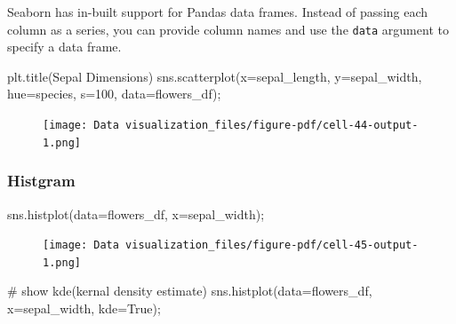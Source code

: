 \documentclass[
  letterpaper,
  DIV=11,
  numbers=noendperiod]{scrreprt}
\newenvironment{Shaded}{\begin{snugshade}}{\end{snugshade}}
\newcommand{\CommentTok}[1]{\textcolor[rgb]{0.37,0.37,0.37}{#1}}
\newcommand{\DecValTok}[1]{\textcolor[rgb]{0.68,0.00,0.00}{#1}}
\newcommand{\NormalTok}[1]{\textcolor[rgb]{0.00,0.23,0.31}{#1}}
\newcommand{\OperatorTok}[1]{\textcolor[rgb]{0.37,0.37,0.37}{#1}}
\newcommand{\StringTok}[1]{\textcolor[rgb]{0.13,0.47,0.30}{#1}}
\newcommand{\VariableTok}[1]{\textcolor[rgb]{0.07,0.07,0.07}{#1}}
\begin{document}
Seaborn has in-built support for Pandas data frames. Instead of passing
each column as a series, you can provide column names and use the
\texttt{data} argument to specify a data frame.

\begin{Shaded}
\begin{Highlighting}[]
\NormalTok{plt.title(}\StringTok{\textquotesingle{}Sepal Dimensions\textquotesingle{}}\NormalTok{)}
\NormalTok{sns.scatterplot(x}\OperatorTok{=}\StringTok{\textquotesingle{}sepal\_length\textquotesingle{}}\NormalTok{, }
\NormalTok{                y}\OperatorTok{=}\StringTok{\textquotesingle{}sepal\_width\textquotesingle{}}\NormalTok{, }
\NormalTok{                hue}\OperatorTok{=}\StringTok{\textquotesingle{}species\textquotesingle{}}\NormalTok{,}
\NormalTok{                s}\OperatorTok{=}\DecValTok{100}\NormalTok{,}
\NormalTok{                data}\OperatorTok{=}\NormalTok{flowers\_df)}\OperatorTok{;}
\end{Highlighting}
\end{Shaded}

\begin{figure}[H]

{\centering \texttt{[image: Data visualization\_files/figure-pdf/cell-44-output-1.png]}

}

\end{figure}

\hypertarget{histgram-1}{%
\subsubsection{Histgram}\label{histgram-1}}

\begin{Shaded}
\begin{Highlighting}[]
\NormalTok{sns.histplot(data}\OperatorTok{=}\NormalTok{flowers\_df, x}\OperatorTok{=}\StringTok{\textquotesingle{}sepal\_width\textquotesingle{}}\NormalTok{)}\OperatorTok{;}
\end{Highlighting}
\end{Shaded}

\begin{figure}[H]

{\centering \texttt{[image: Data visualization\_files/figure-pdf/cell-45-output-1.png]}

}

\end{figure}

\begin{Shaded}
\begin{Highlighting}[]
\CommentTok{\# show kde(kernal density estimate)}
\NormalTok{sns.histplot(data}\OperatorTok{=}\NormalTok{flowers\_df, x}\OperatorTok{=}\StringTok{\textquotesingle{}sepal\_width\textquotesingle{}}\NormalTok{, kde}\OperatorTok{=}\VariableTok{True}\NormalTok{)}\OperatorTok{;}
\end{Highlighting}
\end{Shaded}
\end{document}
